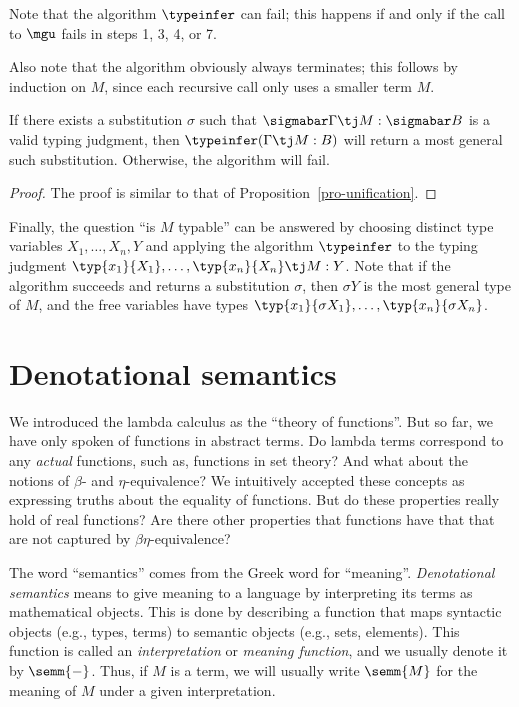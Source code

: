 \documentclass[12pt]{article}
\begin{document}
Note that the algorithm $\typeinfer$ can fail; this happens if and
only if the call to $\mgu$ fails in steps 1, 3, 4, or 7.

Also note that the algorithm obviously always terminates; this follows
by induction on $M$, since each recursive call only uses a smaller
term $M$. 

\begin{proposition}
  If there exists a substitution $\sigma$ such that
  $\sigmabar\Gamma\tj M:\sigmabar B$ is a valid typing judgment, then
  $\typeinfer (\Gamma\tj M: B)$ will return a most general such
  substitution. Otherwise, the algorithm will fail. 
\end{proposition}

\begin{proof}
  The proof is similar to that of Proposition~\ref{pro-unification}.
  \eot
\end{proof}

Finally, the question ``is $M$ typable'' can be answered by choosing
distinct type variables $X_1,\ldots,X_n,Y$ and applying the algorithm
$\typeinfer$ to the typing judgment
$\typ{x_1}{X_1},\ldots,\typ{x_n}{X_n}\tj M:Y$. Note that if the
algorithm succeeds and returns a substitution $\sigma$, then $\sigma
Y$ is the most general type of $M$, and the free variables have types
$\typ{x_1}{\sigma X_1},\ldots,\typ{x_n}{\sigma X_n}$.

\section{Denotational semantics}\label{sec-set-semantics}

We introduced the lambda calculus as the ``theory of functions''. But
so far, we have only spoken of functions in abstract terms. Do lambda
terms correspond to any {\em actual} functions, such as, functions in
set theory? And what about the notions of $\beta$- and
$\eta$-equivalence?  We intuitively accepted these concepts as
expressing truths about the equality of functions. But do these
properties really hold of real functions? Are there other properties
that functions have that that are not captured by $\beta\eta$-equivalence?

The word ``semantics'' comes from the Greek word for ``meaning''.
{\em Denotational semantics} means to give meaning to a language by
interpreting its terms as mathematical objects. This is done by
describing a function that maps syntactic objects (e.g., types,
terms) to semantic objects (e.g., sets, elements). This function is
called an {\em interpretation} or {\em meaning function}, and we
usually denote it by $\semm{-}$. Thus, if $M$ is a term, we will
usually write $\semm{M}$ for the meaning of $M$ under a given
interpretation.
\end{document}
